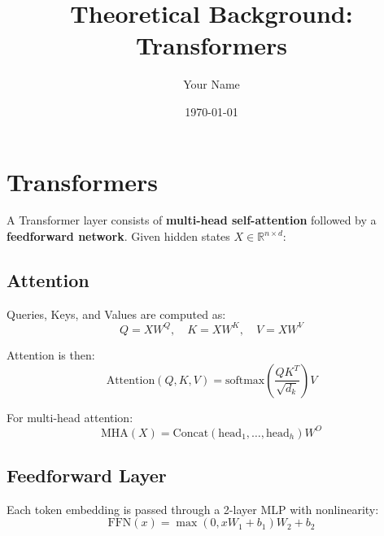 \documentclass{article}
\title{Theoretical Background: Transformers}
\author{Your Name}
\date{\today}
\begin{document}
\maketitle

\section{Transformers}
A Transformer layer consists of \textbf{multi-head self-attention} followed by a \textbf{feedforward network}.
Given hidden states $X \in \mathbb{R}^{n \times d}$:

\subsection{Attention}
Queries, Keys, and Values are computed as:
\begin{equation}
Q = XW^Q, \quad K = XW^K, \quad V = XW^V
\end{equation}

Attention is then:
\begin{equation}
\text{Attention}(Q,K,V) = \text{softmax}\left(\frac{QK^T}{\sqrt{d_k}}\right)V
\end{equation}

For multi-head attention:
\begin{equation}
\text{MHA}(X) = \text{Concat}(\text{head}_1, \ldots, \text{head}_h)W^O
\end{equation}

\subsection{Feedforward Layer}
Each token embedding is passed through a 2-layer MLP with nonlinearity:
\begin{equation}
\text{FFN}(x) = \max(0, xW_1 + b_1)W_2 + b_2
\end{equation}
\end{document}
